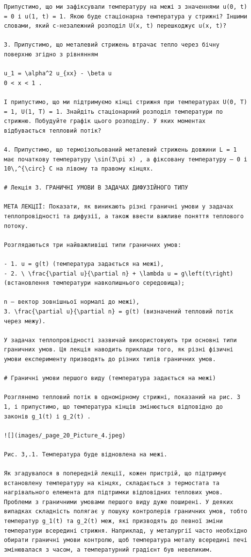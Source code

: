 \documentclass[
  ukrainian,
]{article}
\begin{document}
\begin{verbatim}
Припустимо, що ми зафіксували температуру на межі з значеннями u(0, t) = 0 і u(1, t) = 1. Якою буде стаціонарна температура у стрижні? Іншими словами, який c-незалежний розподіл U(x, t) перешкоджує u(x, t)?

3. Припустимо, що металевий стрижень втрачає тепло через бічну поверхню згідно з рівнянням

u_1 = \alpha^2 u_{xx} - \beta u
0 < x < 1 .

І припустимо, що ми підтримуємо кінці стрижня при температурах U(0, T) = 1, U(1, T) = 1. Знайдіть стаціонарний розподіл температури по стрижню. Побудуйте графік цього розподілу. У яких моментах відбувається тепловий потік?

4. Припустимо, що термоізольований металевий стрижень довжини L = 1 має початкову температуру \sin(3\pi x) , а фіксовану температуру — 0 і 10\,^{\circ} C на лівому та правому кінцях.

# Лекція 3. ГРАНИЧНІ УМОВИ В ЗАДАЧАХ ДИФУЗІЙНОГО ТИПУ

МЕТА ЛЕКЦІЇ: Показати, як виникають різні граничні умови у задачах теплопровідності та дифузії, а також ввести важливе поняття теплового потоку.

Розглядаються три найважливіші типи граничних умов:

- 1. u = g(t) (температура задається на межі),
- 2. \ \frac{\partial u}{\partial n} + \lambda u = g\left(t\right) (встановлення температури навколишнього середовища);

n — вектор зовнішньої нормалі до межі), 
3. \frac{\partial u}{\partial n} = g(t) (визначений тепловий потік через межу).

У задачах теплопровідності зазвичай використовують три основні типи граничних умов. Ця лекція наводить приклади того, як різні фізичні умови експерименту призводять до різних типів граничних умов.

# Граничні умови першого виду (температура задається на межі)

Розглянемо тепловий потік в одномірному стрижні, показаний на рис. 3 1, і припустимо, що температура кінців змінюється відповідно до законів g_1(t) і g_2(t) .

![](images/_page_20_Picture_4.jpeg)

Рис. 3,.1. Температура буде відновлена на межі.

Як згадувалося в попередній лекції, кожен пристрій, що підтримує встановлену температуру на кінцях, складається з термостата та нагрівального елемента для підтримки відповідних теплових умов. Проблеми з граничними умовами першого виду дуже поширені. У деяких випадках складність полягає у пошуку контролерів граничних умов, тобто температур g_1(t) та g_2(t) меж, які призводять до певної зміни температури всередині стрижня. Наприклад, у металургії часто необхідно обирати граничні умови контролю, щоб температура металу всередині печі змінювалася з часом, а температурний градієнт був невеликим.


\end{verbatim}
\end{document}
